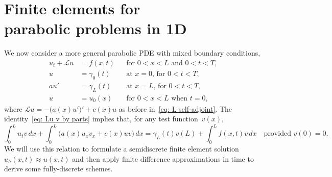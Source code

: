 \chapter[Finite elements for parabolic problems]{Finite elements for \\
parabolic problems in 1D}

We now consider a more general parabolic PDE with mixed boundary conditions,
\begin{equation}\label{eq: parabolic ivp 1d}
\begin{aligned}
u_t+\mathcal{L}u&=f(x,t)&&\text{for $0<x<L$ and $0<t<T$,}\\
u&=\gamma_0(t)&&\text{at $x=0$, for $0<t<T$,}\\
au'&=\gamma_L(t)&&\text{at $x=L$, for $0<t<T$,}\\
u&=u_0(x)&&\text{for $0<x<L$ when $t=0$,}
\end{aligned}
\end{equation}
where $\mathcal{L}u=-\bigl(a(x)u'\bigr)'+c(x)u$ as before 
in~\eqref{eq: L self-adjoint}.  The identity~\eqref{eq: Lu v by parts} implies 
that, for any test function~$v(x)$,
\begin{equation}\label{eq: parabolic 1d weak}
\int_0^Lu_tv\,dx+\int_0^L\bigl(a(x)u_xv_x+c(x)uv\bigr)\,dx
	=\gamma_L(t)v(L)+\int_0^Lf(x,t)v\,dx
\quad\text{provided $v(0)=0$.}
\end{equation}
We will use this relation to formulate a semidiscrete finite element 
solution~$u_h(x,t)\approx u(x,t)$ and then apply finite difference 
approximations in time to derive some fully-discrete schemes.

